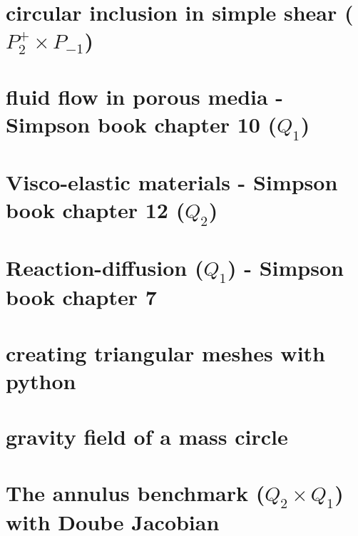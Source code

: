\documentclass[a4paper,11pt]{report}
\begin{document}
\chapter{circular inclusion in simple shear ($P_2^+\times P_{-1}$)\label{f127}} %

\chapter{fluid flow in porous media - Simpson book chapter 10 ($Q_1$)\label{f128}} %

\chapter{Visco-elastic materials - Simpson book chapter 12 ($Q_2$)\label{f129}} %

\chapter{Reaction-diffusion ($Q_1$) - Simpson book chapter 7\label{f130}} %

\chapter{creating triangular meshes with python \label{f131}} %

\chapter{gravity field of a mass circle\label{f132}} %

\chapter{The annulus benchmark ($Q_2\times Q_1$) with Doube Jacobian \label{133}} %
\end{document}
